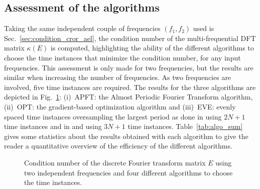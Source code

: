 \subsection{Assessment of the algorithms}
Taking the same independent couple of frequencies $(f_1, f_2)$
used is Sec.~\ref{sec:condition_cror_ael}, the condition number of the
multi-frequential DFT matrix $\kappa (E)$ is computed, highlighting
the ability of the different algorithms to choose the time instances that
minimize the condition number, for any input frequencies. This
assessment is only made for two frequencies, but the results are similar
when increasing the number of frequencies. As two frequencies are
involved, five time instances are required. The results for the three
algorithms are depicted in Fig.~\ref{fig:bench_algo}: (i)~APFT: the
Almost Periodic Fourier Transform algorithm, (ii)~OPT: the
gradient-based optimization algorithm and (iii)~EVE: evenly spaced
time instances oversampling the largest period as done in
\citet{Gopinath2007} using $2N+1$ time
instances and in \citet{Ekici2007} and \citet{Ekici2008} using $3N+1$
time instances.
Table~\ref{tab:algo_sum} gives some statistics about the results obtained
with each algorithm to give the reader a quantitative overview of the
efficiency of the different algorithms.
\begin{figure}[htb]
  \centering 
  \caption{Condition number of the discrete Fourier transform matrix $E$
  using two independent frequencies and four different algorithms
  to choose the time instances.}
  \label{fig:bench_algo}
\end{figure}

